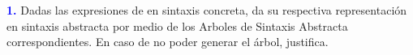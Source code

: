 \newpage
\textbf{\textcolor{blue}{1.}} Dadas las expresiones de 
en sintaxis concreta, da su respectiva representación en sintaxis abstracta
por medio de los Arboles de Sintaxis Abstracta correspondientes. En caso de
no poder generar el árbol, justifica.

